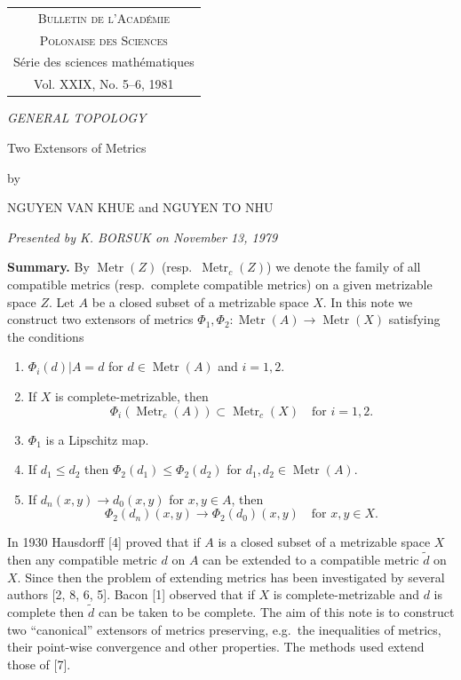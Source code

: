 \documentclass[11pt,a4paper,leqno,twoside]{article}
\newcommand{\Metr}{\operatorname{Metr}}
\newcommand{\restr}{\vert}
\begin{document}
\setcounter{page}{285}
\thispagestyle{plain}
\noindent\begin{tabular}{@{}c@{}}
\textsc{Bulletin de l'Acad\'emie}\\
\textsc{Polonaise des Sciences}\\
S\'erie des sciences math\'ematiques\\
Vol. XXIX, No. 5--6, 1981
\end{tabular}
\vspace{7mm}
\begin{flushright}\textit{GENERAL TOPOLOGY}\end{flushright}
\begin{center}
{\Large Two Extensors of Metrics}\par\medskip
by\par\medskip
NGUYEN VAN KHUE and NGUYEN TO NHU\par\medskip
\textit{Presented by K. BORSUK on November 13, 1979}
\end{center}
\medskip
\begingroup\small
\noindent\textbf{Summary.} By $\Metr(Z)$ (resp.\ $\Metr_c(Z)$) we denote the family of all compatible metrics (resp.\ complete compatible metrics) on a given metrizable space $Z$. Let $A$ be a closed subset of a metrizable space $X$. In this note we construct two extensors of metrics $\Phi_1,\Phi_2:\Metr(A)\to\Metr(X)$ satisfying the conditions
\begin{enumerate}[label=(\roman*),leftmargin=3.5em,itemsep=0pt,topsep=2pt]
\item $\Phi_i(d)\restr A=d$ for $d\in\Metr(A)$ and $i=1,2$.
\item If $X$ is complete-metrizable, then
\[\Phi_i(\Metr_c(A))\subset\Metr_c(X)\quad\text{for }i=1,2.\]
\item $\Phi_1$ is a Lipschitz map.
\item If $d_1\leq d_2$ then $\Phi_2(d_1)\leq\Phi_2(d_2)$ for $d_1,d_2\in\Metr(A)$.
\item If $d_n(x,y)\to d_0(x,y)$ for $x,y\in A$, then
\[\Phi_2(d_n)(x,y)\to\Phi_2(d_0)(x,y)\quad\text{for }x,y\in X.\]
\end{enumerate}
\endgroup
In 1930 Hausdorff [4] proved that if $A$ is a closed subset of a metrizable space $X$ then any compatible metric $d$ on $A$ can be extended to a compatible metric $\tilde d$ on $X$. Since then the problem of extending metrics has been investigated by several authors [2, 8, 6, 5]. Bacon [1] observed that if $X$ is complete-metrizable and $d$ is complete then $\tilde d$ can be taken to be complete. The aim of this note is to construct two ``canonical'' extensors of metrics preserving, e.g.\ the inequalities of metrics, their point-wise convergence and other properties. The methods used extend those of [7].
\end{document}
